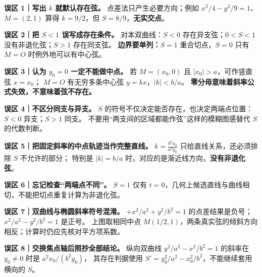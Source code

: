 \begin{trapbox}
\begin{center}\end{center}
\textbf{误区 1｜写出 $k$ 就默认存在弦。}
点差法只产生必要方向；例如 $x^2/4-y^2/9=1$、$M=(2,1)$ 算得 $k=9/2$，但 $S=8/9$，\textbf{无实交点}。
\par\medskip\noindent
\textbf{误区 2｜把 $S<1$ 误写成存在条件。}
对本双曲线：$S<0$ 存在异支弦；$0<S<1$ 没有非退化弦；$S>1$ 存在同支弦。
\textbf{边界要单列：}$S=1$ 重合切点，$S=0$ 只有 $M=O$ 时例外地可以有中心弦。
\par\medskip\noindent
\textbf{误区 3｜认为 $y_0=0$ 一定不能做中点。}
若 $M=(x_0,0)$ 且 $|x_0|>a$，可作竖直弦 $x=x_0$；
$M=O$ 有无穷多条中心弦 $y=kx$，$|k|<b/a$。
\textbf{零分母意味着斜率公式失效，不意味着弦不存在。}
\par\medskip\noindent
\textbf{误区 4｜不区分同支与异支。}
$S$ 的符号不仅决定能否存在，也决定两端点位置：$S<0$ 异支；$S>1$ 同支。
不要用``两支间的区域都能作弦''这样的模糊图感替代 $S$ 的代数判断。
\par\medskip\noindent
\textbf{误区 5｜把固定斜率的中点轨迹当作完整直线。}
$k=\frac{b^2x_0}{a^2y_0}$ 只给直线关系，还必须排除 $S$ 不允许的部分；
特别是 $|k|=b/a$ 时，对应的是渐近线方向，\textbf{没有非退化弦}。
\par\medskip\noindent
\textbf{误区 6｜忘记检查``两端点不同''。}
$S=1$ 仅有 $t=0$，几何上候选直线与曲线相切，不能把切点重复计算为非退化弦。
\par\medskip\noindent
\end{trapbox}
\clearpage
\begin{trapbox}
\begin{center}\end{center}
\textbf{误区 7｜双曲线与椭圆斜率符号混淆。}
$+x^2/a^2+y^2/b^2=1$ 的点差结果是负号；
$x^2/a^2-y^2/b^2=1$ 是正号。
上图取相同中点 $M(1/2,1)$，两条真实弦的倾斜方向相反；计算时仍应先核对平方项系数。
\par\medskip\noindent
\textbf{误区 8｜交换焦点轴后照抄全部结论。}
纵向双曲线 $y^2/a^2-x^2/b^2=1$ 的斜率在 $y_0\ne0$ 时是 $a^2x_0/(b^2y_0)$，
其存在判据使用 $S'=y_0^2/a^2-x_0^2/b^2$，不能继续套用横向的 $S$。
\end{trapbox}
